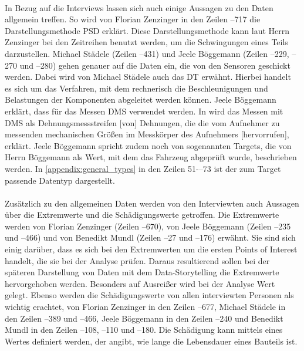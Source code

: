 \\In Bezug auf die Interviews lassen sich auch einige Aussagen zu den Daten allgemein treffen. So wird von Florian Zenzinger in den Zeilen --717 die Darstellungsmethode \ac{PSD} erklärt. Diese Darstellungsmethode kann laut Herrn Zenzinger bei den Zeitreihen benutzt werden, um die Schwingungen eines Teils darzustellen. Michael Städele (Zeilen --431) und Jeele Böggemann (Zeilen --229, --270 und --280) gehen genauer auf die Daten ein, die von den Sensoren geschickt werden. Dabei wird von Michael Städele auch das \ac{DT} erwähnt. Hierbei handelt es sich um das Verfahren, mit dem rechnerisch die Beschleunigungen und Belastungen der Komponenten abgeleitet werden können. Jeele Böggemann erklärt, dass für das Messen \ac{DMS} verwendet werden. In \cite{Keil.2017} wird das Messen mit \ac{DMS} als  Dehnungsmessstreifen [von] Dehnungen, die die vom Aufnehmer zu messenden mechanischen Größen im Messkörper des Aufnehmers [hervorrufen]\grqq{}, erklärt. Jeele Böggemann spricht zudem noch von sogenannten Targets, die von Herrn Böggemann als \glqq Wert, mit dem das Fahrzeug abgeprüft wurde\grqq{}, beschrieben werden. In \ref{appendix:general_types} in den Zeilen 51-–73 ist der zum Target passende Datentyp dargestellt.\\\\Zusätzlich zu den allgemeinen Daten werden von den Interviewten auch Aussagen über die Extremwerte und die Schädigungswerte getroffen. Die Extremwerte werden von Florian Zenzinger (Zeilen --670), von Jeele Böggemann (Zeilen --235 und --466) und von Benedikt Mundl (Zeilen --27 und --176) erwähnt. Sie sind sich einig darüber, dass es sich bei den Extremwerten um die ersten Points of Interest handelt, die sie bei der Analyse prüfen. Daraus resultierend sollen bei der späteren Darstellung von Daten mit dem Data-Storytelling die Extremwerte hervorgehoben werden. Besonders auf \glqq Ausreißer\grqq{} wird bei der Analyse Wert gelegt. Ebenso werden die Schädigungswerte von allen interviewten Personen als wichtig erachtet, von Florian Zenzinger in den Zeilen --677, Michael Städele in den Zeilen --389 und --466, Jeele Böggemann in den Zeilen --240 und Benedikt Mundl in den Zeilen --108, --110 und --180. Die Schädigung kann mittels eines Wertes definiert werden, der angibt, wie lange die Lebensdauer eines Bauteils ist.\\
